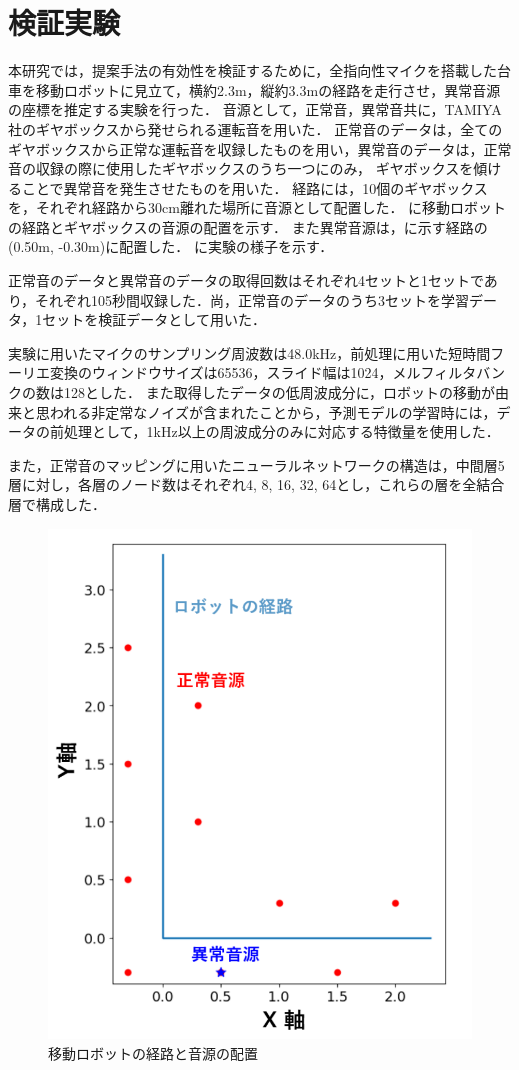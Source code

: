\documentclass[../main]{subfiles}
\begin{document}
\graphicspath{{../figures/}}

\section{検証実験}
本研究では，提案手法の有効性を検証するために，全指向性マイクを搭載した台車を移動ロボットに見立て，横約2.3m，縦約3.3mの経路を走行させ，異常音源の座標を推定する実験を行った．
音源として，正常音，異常音共に，TAMIYA社のギヤボックスから発せられる運転音を用いた．
正常音のデータは，全てのギヤボックスから正常な運転音を収録したものを用い，異常音のデータは，正常音の収録の際に使用したギヤボックスのうち一つにのみ，
ギヤボックスを傾けることで異常音を発生させたものを用いた．
経路には，10個のギヤボックスを，それぞれ経路から30cm離れた場所に音源として配置した．
に移動ロボットの経路とギヤボックスの音源の配置を示す．
また異常音源は，に示す経路の(0.50m, -0.30m)に配置した．
に実験の様子を示す．


正常音のデータと異常音のデータの取得回数はそれぞれ4セットと1セットであり，それぞれ105秒間収録した．尚，正常音のデータのうち3セットを学習データ，1セットを検証データとして用いた．


実験に用いたマイクのサンプリング周波数は48.0kHz，前処理に用いた短時間フーリエ変換のウィンドウサイズは65536，スライド幅は1024，メルフィルタバンクの数は128とした．
また取得したデータの低周波成分に，ロボットの移動が由来と思われる非定常なノイズが含まれたことから，予測モデルの学習時には，データの前処理として，1kHz以上の周波成分のみに対応する特徴量を使用した．

また，正常音のマッピングに用いたニューラルネットワークの構造は，中間層5層に対し，各層のノード数はそれぞれ4, 8, 16, 32, 64とし，これらの層を全結合層で構成した．

\begin{figure}[tb]
  \centering
  \includegraphics[keepaspectratio, width=0.8\linewidth]{route.pdf}
  \caption{移動ロボットの経路と音源の配置}
\end{figure}
\end{document}
